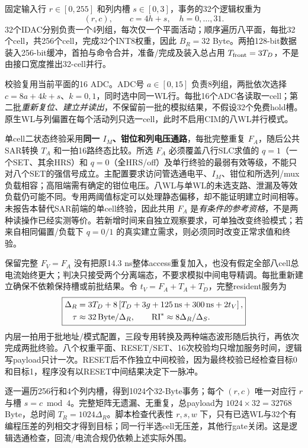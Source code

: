 固定输入行 $r\in[0,255]$ 和列内槽 $s\in[0,3]$，事务的32个逻辑权重为
\[
 (r,c),\qquad c=4h+s,\quad h=0,\ldots,31.
\]
32个IDAC分别负责一个4列组，每次仅一个平面活动；顺序遍历八平面，每批32个cell，共256个cell，完成32个INT8权重，因此 $B_R=32$ Byte。两拍128-bit数据装入256-bit缓冲，首拍与命令合并，准备/完成及装入总占用 $T_{\rm front}=3T_D$，不是由接口宽度推出32-cell并行。

校验复用当前平面的16 ADC。ADC号 $a\in[0,15]$ 负责8列组，两批依次选择 $c=8a+4k+s$、$k=0,1$，同时选中同一WL行。每批16个ADC各读取一cell；第二批\emph{重新复位、建立并读出}，不保留前一批的模拟结果，不假设32个免费hold槽。原生WL与列偏置在每个活动列只选一cell，此时不启用CIM的八WL并行模式。

单cell二状态终验采用\textbf{同一 $I_M$、钳位和列电压通路}，每批完整重复 $F_A$，随后公共SAR转换 $T_A$ 和一拍16路终态比较。所选 $F_A$ 必须覆盖八行SLC求值的 $q=1$（一个SET、其余HRS）和 $q=0$（全HRS/off）及单行终验的最弱有效等级，不能只对八个SET的强信号成立。主配置要求访问管选通电平、$I_M$、钳位和所选列/mux负载相容；高阻端需有确定的钳位电压。八WL与单WL的未选支路、泄漏及等效负载仍可能不同。专用两阈值标定可以处理静态偏移，却不能证明建立时间相等。未报告本替代SAR前端的单cell终验，因此共用 $F_A$ 是\emph{有条件的参考资格}，不是两种读操作已经实测等价。若新增时间来自独立观察要求，可单独改变终验模式；若来自相同偏置/负载下 $q=0/1$ 的真实建立需求，则必须同时改变正常求值和终验。

保留完整 $F_V=F_A$ 没有把原14.3 ns整体access重复加入，也没有假定全部八cell总电流始终更大；判决只接受两个分离端态，不要求模拟中间电导精调。每批重新建立确保不依赖保持槽或前批结果。令 $t_V=F_A+T_A+T_D$，完整resident服务为
\begin{equation}
\boxed{\begin{aligned}
 \Delta_R&=3T_D+8\left[T_D+3g+125\,\mathrm{ns}+300\,\mathrm{ns}+2t_V\right],\\
 \tau&\approx32\,\mathrm{Byte}/\Delta_R,\qquad
 \mathrm{RI}^*\approx8\Delta_R/\Delta_S.
\end{aligned}}
\end{equation}
内层一拍用于批地址/模式配置，三段专用转换及两种端态波形随后执行，再依次完成两批终验。八个权重平面、RESET/SET、16次校验均只增加服务时间，逻辑写payload只计一次。RESET后不作独立中间校验，因为最终校验已经检查目标0和目标1，程序没有以RESET中间结果决定下一脉冲。

逐一遍历256行和4个列内槽，得到1024个32-Byte事务；每个 $(r,c)$ 唯一对应行 $r$ 与槽 $s=c\bmod4$。完整矩阵无遗漏、无重复，总payload为 $1024\times32=32768$ Byte，总时间 $T_R=1024\Delta_R$。脚本检查代表性 $r,s,w$ 下，只有已选WL与32个有编程压差的列相交才得到目标；同一行半选cell无压差，其他行gate关闭。这是逻辑选通检查，回流/电流合规仍依赖上述实际外围。


